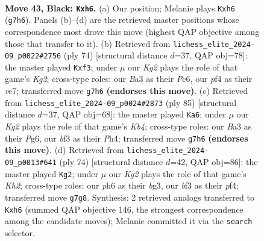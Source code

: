 \documentclass[11pt]{article}
\begin{document}
\clearpage

\begin{figure}[p]\centering
\begin{subfigure}{0.46\textwidth}\centering
\resizebox{\linewidth}{!}{%
\newchessgame
\chessboard[
  setfen={8/pp4k1/6pP/4R3/5P1P/b1q2BK1/8/8 b - - 0 43},
  showmover=false,
  pgfstyle=straightmove, color=movearrow, markmove={g7-h6}
]}
\caption{}
\end{subfigure}\hfill
\begin{subfigure}{0.46\textwidth}\centering
\resizebox{\linewidth}{!}{%
\newchessgame
\chessboard[
  setfen={8/4r3/2P3p1/3Qbk2/8/4Pp2/6K1/8 w - - 0 38},
  showmover=false,
  pgfstyle=straightmove, color=movearrow, markmove={g2-f3}
]}
\caption{}
\end{subfigure}
\\[4pt]
\begin{subfigure}{0.46\textwidth}\centering
\resizebox{\linewidth}{!}{%
\newchessgame
\chessboard[
  setfen={2R5/8/1p4p1/1k4P1/2P4p/K3p2P/PBq5/8 b - - 0 43},
  showmover=false,
  pgfstyle=straightmove, color=movearrow, markmove={b5-a6}
]}
\caption{}
\end{subfigure}\hfill
\begin{subfigure}{0.46\textwidth}\centering
\resizebox{\linewidth}{!}{%
\newchessgame
\chessboard[
  setfen={4r3/8/p2Q2n1/1p4k1/5p2/1P4bP/P6K/8 w - - 1 38},
  showmover=false,
  pgfstyle=straightmove, color=movearrow, markmove={h2-g2}
]}
\caption{}
\end{subfigure}
\caption{\textbf{Move 43, Black: \texttt{Kxh6}.} (a) Our position; Melanie plays \texttt{Kxh6} (\texttt{g7h6}). Panels (b)--(d) are the retrieved master positions whose correspondence most drove this move (highest QAP objective among those that transfer to it). (b) Retrieved from \texttt{lichess\_elite\_2024-09\_p0022\#2756} (ply 74) [structural distance $d$=37, QAP obj=78]: the master played \texttt{Kxf3}; under $\mu$ our \emph{Kg2} plays the role of that game's \emph{Kg2}; cross-type roles: our \emph{B}a3 as their \emph{P}c6, our \emph{p}f4 as their \emph{r}e7; transferred move \texttt{g7h6} \textbf{(endorses this move)}. (c) Retrieved from \texttt{lichess\_elite\_2024-09\_p0024\#2873} (ply 85) [structural distance $d$=37, QAP obj=68]: the master played \texttt{Ka6}; under $\mu$ our \emph{Kg2} plays the role of that game's \emph{Kb4}; cross-type roles: our \emph{B}a3 as their \emph{P}g6, our \emph{b}f3 as their \emph{P}h4; transferred move \texttt{g7h6} \textbf{(endorses this move)}. (d) Retrieved from \texttt{lichess\_elite\_2024-09\_p0013\#641} (ply 74) [structural distance $d$=42, QAP obj=86]: the master played \texttt{Kg2}; under $\mu$ our \emph{Kg2} plays the role of that game's \emph{Kh2}; cross-type roles: our \emph{p}h6 as their \emph{b}g3, our \emph{b}f3 as their \emph{p}f4; transferred move \texttt{g7g8}. Synthesis: 2 retrieved analogs transferred to \texttt{Kxh6} (summed QAP objective 146, the strongest correspondence among the candidate moves); Melanie committed it via the \texttt{search} selector.}
\label{fig:thought-m85}
\end{figure}
\end{document}
